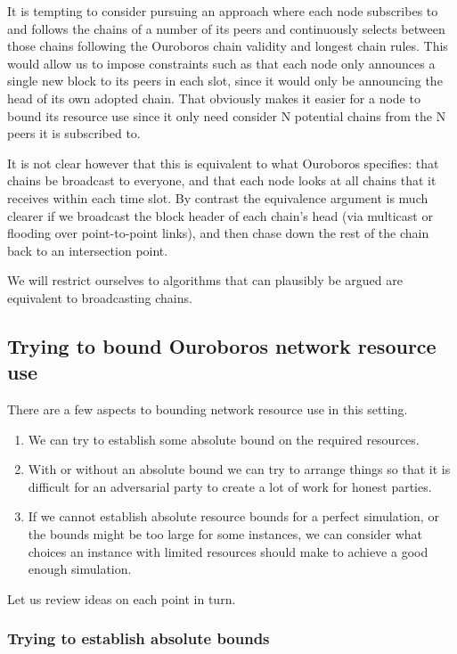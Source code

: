 \documentclass{article}
\theoremstyle{definition}{
  \newtheorem{lemma}{Lemma}[section] %
  \newtheorem{definition}[lemma]{Definition}
}
\theoremstyle{theorem}{
  \newtheorem{invariant}[lemma]{Invariant}
  \newtheorem{proofobligation}[lemma]{Proof Obligation}
}
\numberwithin{equation}{lemma}
\begin{document}
It is tempting to consider pursuing an approach where each node subscribes to
and follows the chains of a number of its peers and continuously selects
between those chains following the Ouroboros chain validity and longest chain
rules. This would allow us to impose constraints such as that each node only
announces a single new block to its peers in each slot, since it would only be
announcing the head of its own adopted chain. That obviously makes it easier
for a node to bound its resource use since it only need consider N potential
chains from the N peers it is subscribed to.

It is not clear however that this is equivalent to what Ouroboros specifies:
that chains be broadcast to everyone, and that each node looks at all chains
that it receives within each time slot. By contrast the equivalence argument is
much clearer if we broadcast the block header of each chain's head (via
multicast or flooding over point-to-point links), and then chase down the rest
of the chain back to an intersection point.

We will restrict ourselves to algorithms that can plausibly be argued are
equivalent to broadcasting chains.

\subsection{Trying to bound Ouroboros network resource use}

There are a few aspects to bounding network resource use in this setting.
\begin{enumerate}
\item We can try to establish some absolute bound on the required resources.
\item With or without an absolute bound we can try to arrange things so that it
      is difficult for an adversarial party to create a lot of work for honest
      parties.
\item If we cannot establish absolute resource bounds for a perfect simulation,
      or the bounds might be too large for some instances, we can consider what
      choices an instance with limited resources should make to achieve a good
      enough simulation.
\end{enumerate}

Let us review ideas on each point in turn.

\subsubsection{Trying to establish absolute bounds}
\end{document}
